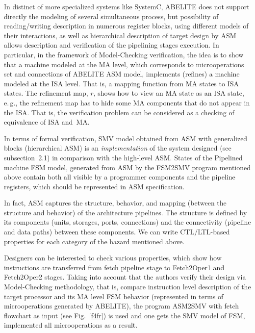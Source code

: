 \begin{multicols}{2}
       In distinct of more specialized systems like SystemC, ABELITE does not support 
directly the modeling of several simultaneous process, but possibility of reading/writing 
description in numerous register blocks, using different models of their interactions, as well as 
hierarchical description of target design by ASM allows description and verification of the 
pipelining stages execution. In particular, in the framework of Model-Checking verification, the 
idea is to show that a machine modeled at the MA level, which corresponds 
to microoperations set and connections of ABELITE ASM model, implements 
(refines) a machine modeled at the ISA level. That is, a mapping 
function from MA states to ISA states. The refinement map, $r$, shows how to view an MA state 
as an ISA state, e.\,g., the refinement map has to hide some MA components that do not appear in 
the ISA. That is,  the verification problem can be considered as a checking of equivalence of ISA 
and~MA.
       
In terms of formal verification, SMV model obtained from ASM with generalized blocks 
(hierarchical ASM) is an \textit{implementation} of the system designed (see subsection~2.1) in comparison 
with the high-level ASM.  States of the Pipelined machine FSM model, generated from ASM by 
the FSM2SMV program mentioned above contain both all visible by a programmer components 
and the pipeline registers, which should be represented in ASM specification.

In fact, ASM captures the structure, behavior, and mapping (between the structure and behavior) 
of the architecture pipelines. The structure is defined by its components (units, storages, ports, 
connections) and the connectivity (pipeline and data paths) between these components. We can 
write CTL/LTL-based properties for each category of the hazard mentioned above. 

Designers can be interested to check various properties, which show how instructions are 
transferred from fetch pipeline stage to Fetch2Oper1 and Fetch2Oper2 stages. Taking into 
account that the authors verify their design via Model-Checking methodology, that is, compare 
instruction level description of the target processor and its MA level FSM behavior 
(represented in terms of microoperations generated by ABELITE), the program 
ASM2SMV with fetch flowchart as input (see Fig.~\ref{f4fr}) is used and one gets the SMV model of FSM, 
implemented all microoperations as a result. 


\end{multicols}

